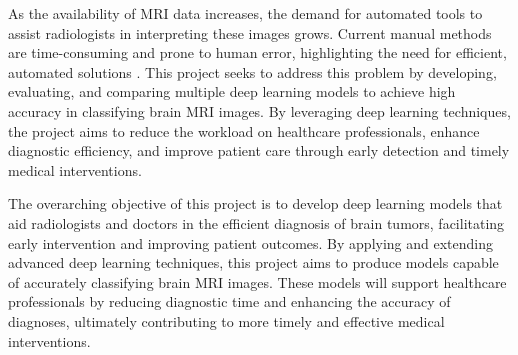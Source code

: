 As the availability of MRI data increases, the demand for automated tools to assist radiologists in interpreting these images grows. Current manual methods are time-consuming and prone to human error, highlighting the need for efficient, automated solutions \cite{lenchik_automated_2019}. This project seeks to address this problem by developing, evaluating, and comparing multiple deep learning models to achieve high accuracy in classifying brain MRI images. By leveraging deep learning techniques, the project aims to reduce the workload on healthcare professionals, enhance diagnostic efficiency, and improve patient care through early detection and timely medical interventions.


The overarching objective of this project is to develop deep learning models that aid radiologists and doctors in the efficient diagnosis of brain tumors, facilitating early intervention and improving patient outcomes. By applying and extending advanced deep learning techniques, this project aims to produce models capable of accurately classifying brain MRI images. These models will support healthcare professionals by reducing diagnostic time and enhancing the accuracy of diagnoses, ultimately contributing to more timely and effective medical interventions.


